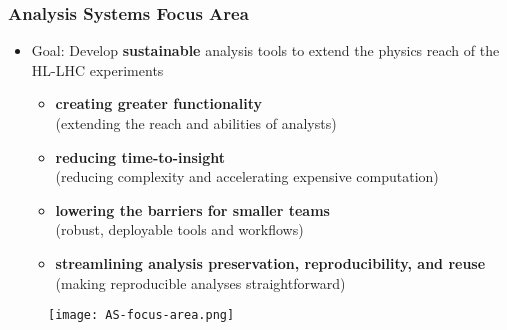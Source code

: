 \begin{frame}
  \frametitle{Analysis Systems Focus Area}

  \vspace*{10pt}
  \begin{itemize}\setlength{\itemsep}{0.2 cm}
    \item Goal: Develop \textbf{sustainable} analysis tools to extend the physics reach of the HL-LHC experiments
  \begin{itemize}\setlength{\itemsep}{0.2 cm}
      \item \textbf{creating greater functionality}\\(extending the reach and abilities of analysts)
      \item \textbf{reducing time-to-insight}\\(reducing complexity and accelerating expensive computation)
      \item \textbf{lowering the barriers for smaller teams}\\(robust, deployable tools and workflows)
      \item \textbf{streamlining analysis preservation, reproducibility, and reuse}\\(making reproducible analyses straightforward)
    \end{itemize}
  \end{itemize}
  \vspace*{5pt}
  \begin{figure}
    \begin{center}
      \texttt{[image: AS-focus-area.png]}
    \end{center}
  \end{figure}

\end{frame}

